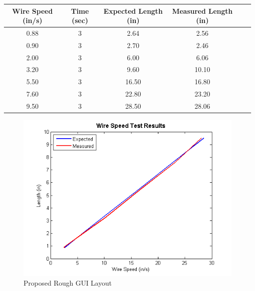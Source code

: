 \documentclass[12pt]{article}
\begin{document}
\begin{center}


\begin{tabular}{ |c|c|c|c|c|c| }


  \hline
  \textbf{Wire Speed (in/s)} & \textbf{Time (sec)} & \textbf{Expected Length (in)} & \textbf{Measured Length (in)} \\ \hline
  0.88 & 3 & 2.64 & 2.56 \\ \hline
  0.90 & 3 & 2.70 & 2.46 \\ \hline
  2.00 & 3 & 6.00 & 6.06 \\ \hline
  3.20 & 3 & 9.60 & 10.10 \\ \hline
  5.50 & 3 & 16.50 & 16.80 \\ \hline
    7.60 & 3 & 22.80 & 23.20 \\ \hline
      9.50 & 3 & 28.50 & 28.06 \\ \hline
      

  
\end{tabular}




\end{center}


\begin{figure}[!h]
\centering
\includegraphics[scale=0.95]{speedplot}
\caption{Proposed Rough GUI Layout}
\end{figure}

\clearpage
\end{document}
